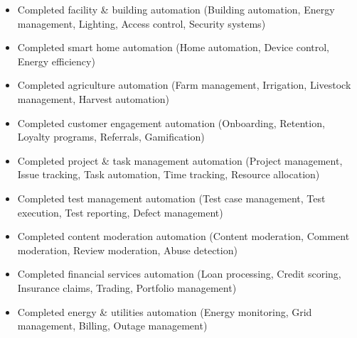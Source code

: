 \documentclass[11pt,a4paper]{article}
\begin{document}
\begin{itemize}
\item Completed facility & building automation (Building automation, Energy management, Lighting, Access control, Security systems)
\end{itemize}

\begin{itemize}
\item Completed smart home automation (Home automation, Device control, Energy efficiency)
\end{itemize}

\begin{itemize}
\item Completed agriculture automation (Farm management, Irrigation, Livestock management, Harvest automation)
\end{itemize}

\begin{itemize}
\item Completed customer engagement automation (Onboarding, Retention, Loyalty programs, Referrals, Gamification)
\end{itemize}

\begin{itemize}
\item Completed project & task management automation (Project management, Issue tracking, Task automation, Time tracking, Resource allocation)
\end{itemize}

\begin{itemize}
\item Completed test management automation (Test case management, Test execution, Test reporting, Defect management)
\end{itemize}

\begin{itemize}
\item Completed content moderation automation (Content moderation, Comment moderation, Review moderation, Abuse detection)
\end{itemize}

\begin{itemize}
\item Completed financial services automation (Loan processing, Credit scoring, Insurance claims, Trading, Portfolio management)
\end{itemize}

\begin{itemize}
\item Completed energy & utilities automation (Energy monitoring, Grid management, Billing, Outage management)
\end{itemize}
\end{document}
